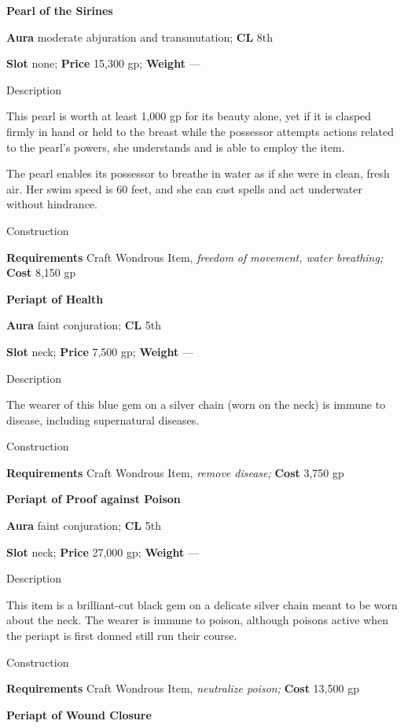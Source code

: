\textbf{Pearl of the Sirines}
				
\textbf{Aura} moderate abjuration and transmutation;\textbf{ CL }8th
				
\textbf{Slot} none; \textbf{Price} 15,300 gp; \textbf{Weight }---
				
Description
				
This pearl is worth at least 1,000 gp for its beauty alone, yet if it is clasped firmly in hand or held to the breast while the possessor attempts actions related to the pearl's powers, she understands and is able to employ the item.
				
The pearl enables its possessor to breathe in water as if she were in clean, fresh air. Her swim speed is 60 feet, and she can cast spells and act underwater without hindrance. 
				
Construction
				
\textbf{Requirements} Craft Wondrous Item,\textit{ freedom of movement, water breathing;}\textbf{ Cost }8,150 gp
				
\textbf{Periapt of Health}
				
\textbf{Aura} faint conjuration;\textbf{ CL }5th
				
\textbf{Slot} neck; \textbf{Price} 7,500 gp; \textbf{Weight }---
				
Description
				
The wearer of this blue gem on a silver chain (worn on the neck) is immune to disease, including supernatural diseases. 
				
Construction
				
\textbf{Requirements} Craft Wondrous Item,\textit{ remove disease;}\textbf{ Cost }3,750 gp
				
\textbf{Periapt of Proof against Poison}
				
\textbf{Aura} faint conjuration;\textbf{ CL }5th
				
\textbf{Slot} neck; \textbf{Price} 27,000 gp; \textbf{Weight }---
				
Description
				
This item is a brilliant-cut black gem on a delicate silver chain meant to be worn about the neck. The wearer is immune to poison, although poisons active when the periapt is first donned still run their course. 
				
Construction
				
\textbf{Requirements} Craft Wondrous Item,\textit{ neutralize poison;}\textbf{ Cost }13,500 gp
				
\textbf{Periapt of Wound Closure}
				

